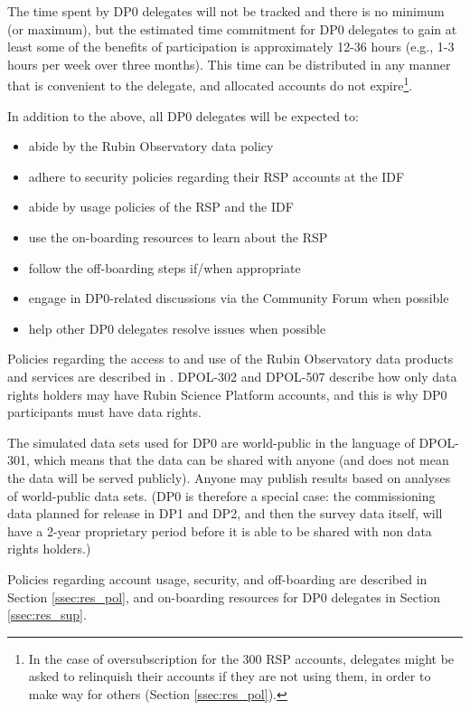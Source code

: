 \documentclass[DM,lsstdraft,authoryear,toc]{lsstdoc}
\begin{document}
The time spent by DP0 delegates will not be tracked and there is no minimum (or maximum), but the estimated time commitment for DP0 delegates to gain at least some of the benefits of participation is approximately 12-36 hours (e.g., 1-3 hours per week over three months).
This time can be distributed in any manner that is convenient to the delegate, and allocated accounts do not expire\footnote{In the case of oversubscription for the 300 RSP accounts, delegates might be asked to relinquish their accounts if they are not using them, in order to make way for others (Section \ref{ssec:res_pol}).}.

In addition to the above, all DP0 delegates will be expected to:
\begin{itemize}
\item abide by the Rubin Observatory data policy 
\item adhere to security policies regarding their RSP accounts at the IDF
\item abide by usage policies of the RSP and the IDF
\item use the on-boarding resources to learn about the RSP
\item follow the off-boarding steps if/when appropriate
\item engage in DP0-related discussions via the Community Forum when possible
\item help other DP0 delegates resolve issues when possible
\end{itemize}

Policies regarding the access to and use of the Rubin Observatory data products and services are described in .
DPOL-302 and DPOL-507 describe how only data rights holders may have Rubin Science Platform accounts, and this is why DP0 participants must have data rights.

The simulated data sets used for DP0 are world-public in the language of DPOL-301, which means that the data can be shared with anyone (and does not mean the data will be served publicly).
Anyone may publish results based on analyses of world-public data sets.
(DP0 is therefore a special case: the commissioning data planned for release in DP1 and DP2, and then the survey data itself, will have a 2-year proprietary period before it is able to be shared with non data rights holders.)

Policies regarding account usage, security, and off-boarding are described in Section \ref{ssec:res_pol}, and on-boarding resources for DP0 delegates in Section \ref{ssec:res_sup}. 
\end{document}
